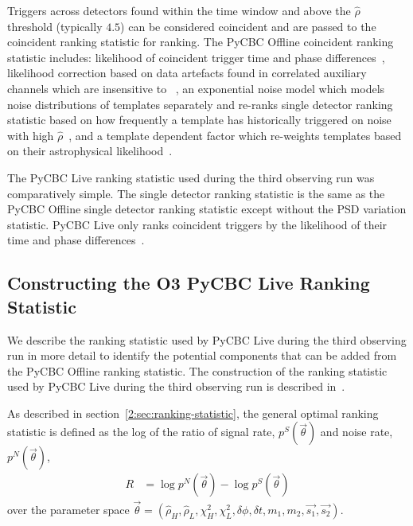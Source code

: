 Triggers across detectors found within the time window and above the $\hat{\rho}$ threshold (typically $4.5$) can be considered coincident and are passed to the coincident ranking statistic for ranking. The PyCBC Offline coincident ranking statistic includes: likelihood of coincident trigger time and phase differences~\cite{PyCBC:2016}, likelihood correction based on data artefacts found in correlated auxiliary channels which are insensitive to \gws~\cite{DQ_vetoes:2017, iDQ:2020}, an exponential noise model which models noise distributions of templates separately and re-ranks single detector ranking statistic based on how frequently a template has historically triggered on noise with high $\hat{\rho}$~\cite{PyCBC:2017}, and a template dependent factor which re-weights templates based on their astrophysical likelihood~\cite{PyCBC_focussed_bbh:2024}.

The PyCBC Live ranking statistic used during the third observing run was comparatively simple. The single detector ranking statistic is the same as the PyCBC Offline single detector ranking statistic except without the PSD variation statistic. PyCBC Live only ranks coincident triggers by the likelihood of their time and phase differences~\cite{PyCBC_Live:2018}.

\subsection{\label{5:sec:old-stat-construction}Constructing the O3 PyCBC Live Ranking Statistic}

We describe the ranking statistic used by PyCBC Live during the third observing run in more detail to identify the potential components that can be added from the PyCBC Offline ranking statistic. The construction of the ranking statistic used by PyCBC Live during the third observing run is described in~\cite{PyCBC_Live:2018}.

As described in section~\ref{2:sec:ranking-statistic}, the general optimal ranking statistic is defined as the log of the ratio of signal rate, $ p^{S}(\Vec{\theta})$ and noise rate,  $p^{N}(\Vec{\theta})$,
%
\begin{align}
    R &= \log p^{N}(\Vec{\theta}) - \log p^{S}(\Vec{\theta})
\end{align}
%
over the parameter space $\Vec{\theta} = \left(\hat{\rho}_{H}, \hat{\rho}_{L}, \chi^{2}_{H}, \chi^{2}_{L}, \delta\phi, \delta t, m_{1}, m_{2}, \Vec{s_{1}}, \Vec{s_{2}}\right)$. 

